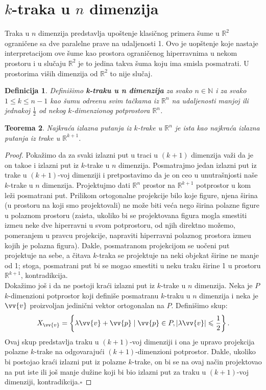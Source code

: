 \documentclass[11pt,letter]{article}
\newtheorem{teo}{\bf Teorema}[section]
\newtheorem{df}[teo]{\bf Definicija}
\newcommand{\qed}{\hfill $\square$ \bigskip}
\begin{document}
\section[$k$-traka u $n$ dimenzija]{$k$-traka u $n$ dimenzija}
\bigskip
\indent Traka u $n$ dimenzija predstavlja upo\v stenje klasi\v cnog primera \v sume u $\mathbb{R}^2$ ograni\v cene sa dve paralelne prave na udaljenosti 1. Ovo je uop\v stenje koje nastaje interpretacijom ove \v sume kao prostora ograni\v cenog hiperravnima u nekom prostoru i u slu\v caju $\mathbb{R}^2$ je to jedina takva \v suma koju ima smisla posmatrati. U prostorima vi\v sih dimenzija od $\mathbb{R}^2$ to nije slu\v caj.
\\
\begin{df} Defini\v simo \textbf{k-traku u n dimenzija} za svako $n\in \mathbb{N}$ i za svako $1\leqslant k\leqslant n-1$  kao \v sumu odre\dj enu svim ta\v ckama iz $\mathbb{R}^n$ na udaljenosti manjoj ili jednakoj $\frac{1}{2}$ od nekog $k$-dimenzionog potprostora $\mathbb{R}^n$. 
\end{df}
\begin{teo} Najkra\' ca izlazna putanja iz $k$-trake u $\mathbb{R}^n$ je ista kao najkra\' ca izlazna putanja iz trake u $\mathbb{R}^{k+1}$.\end{teo}

\begin{proof}
Poka\v zimo da za svaki izlazni put u traci u $(k+1)$ dimenzija va\v zi da je on tako\dj e i izlazni put iz $k$-trake u $n$ dimenzija. Posmatrajmo jedan izlazni put iz trake u $(k+1)$-voj dimenziji i pretpostavimo da je on ceo u unutra\v snjosti na\v se $k$-trake u $n$ dimenzija. Projektujmo dati $\mathbb{R}^n$ prostor na $\mathbb{R}^{k+1}$ potprostor u kom le\v zi posmatrani put. Prilikom ortogonalne projekcije bilo koje figure, njena \v sirina (u prostoru na koji smo projektovali) ne mo\v ze biti ve\' ca nego \v sirina polazne figure u polaznom prostoru (zaista, ukoliko bi se projektovana figura mogla smestiti izme\dj u neke dve hiperravni u svom potprostoru, od njih direktno mo\v zemo, pomeranjem u pravcu projekcije, napraviti hiperravni polaznog prostora izme\dj u kojih je polazna figura). Dakle, posmatranom projekcijom se uo\v ceni put projektuje na sebe, a \v citava $k$-traka se projektuje na neki objekat \v sirine ne manje od 1; stoga, posmatrani put bi se mogao smestiti u neku traku \v sirine 1 u prostoru $\mathbb{R}^{k+1}$, kontradikcija.
\\
Doka\v zimo jo\v s i da ne postoji kra\' ci izlazni put iz $k$-trake u $n$ dimenzija. Neka je $P$ $k$-dimenzioni potprostor koji defini\v se posmatranu $k$-traku u $n$ dimenzija i neka je $\vv{v}$ proizvoljan jedini\v cni vektor ortogonalan na $P$. Defini\v simo skup:
$$X_{\vv{v}}=\left\{ \lambda \vv{v}+\vv{p}\mid  \vv{p}\in P, |\lambda \vv{v}|\leqslant \frac{1}{2} \right\}.$$
Ovaj skup predstavlja traku u $(k+1)$-voj dimenziji i ona je upravo projekcija polazne $k$-trake na odgovaraju\' ci $(k+1)$-dimenzioni potprostor. Dakle, ukoliko bi postojao kra\' ci izlazni put iz polazne $k$-trake, on bi se na ovaj na\v cin projektovao na put iste ili jo\v s manje du\v zine koji bi bio izlazni put za traku u $(k+1)$-voj dimenziji, kontradikcija.\qed
\end{proof}
\\
\end{document}
